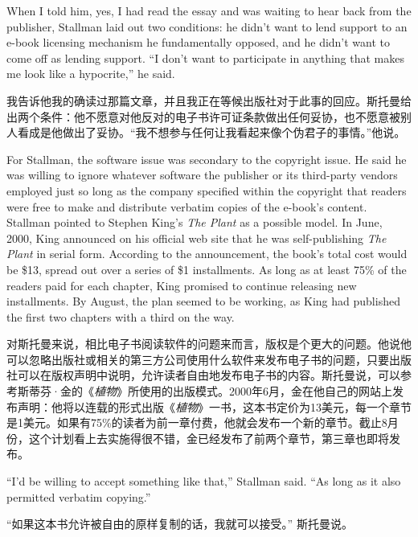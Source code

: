 \ifdefined\eng
When I told him, yes, I had read the essay and was waiting to hear back from the publisher, Stallman laid out two conditions: he didn't want to lend support to an e-book licensing mechanism he fundamentally opposed, and he didn't want to come off as lending support. ``I don't want to participate in anything that makes me look like a hypocrite,'' he said.
\fi

\ifdefined\chs
我告诉他我的确读过那篇文章，并且我正在等候出版社对于此事的回应。斯托曼给出两个条件：他不愿意对他反对的电子书许可证条款做出任何妥协，也不愿意被别人看成是他做出了妥协。``我不想参与任何让我看起来像个伪君子的事情。''他说。
\fi

\ifdefined\eng
For Stallman, the software issue was secondary to the copyright issue. He said he was willing to ignore whatever software the publisher or its third-party vendors employed just so long as the company specified within the copyright that readers were free to make and distribute verbatim copies of the e-book's content. Stallman pointed to Stephen King's \textit{The Plant} as a possible model. In June, 2000, King announced on his official web site that he was self-publishing \textit{The Plant} in serial form. According to the announcement, the book's total cost would be \$13, spread out over a series of \$1 installments. As long as at least 75\% of the readers paid for each chapter, King promised to continue releasing new installments. By August, the plan seemed to be working, as King had published the first two chapters with a third on the way.
\fi

\ifdefined\chs
对斯托曼来说，相比电子书阅读软件的问题来而言，版权是个更大的问题。他说他可以忽略出版社或相关的第三方公司使用什么软件来发布电子书的问题，只要出版社可以在版权声明中说明，允许读者自由地发布电子书的内容。斯托曼说，可以参考斯蒂芬·金的《\textit{植物}》所使用的出版模式。2000年6月，金在他自己的网站上发布声明：他将以连载的形式出版《\textit{植物}》一书，这本书定价为13美元，每一个章节是1美元。如果有75\%的读者为前一章付费，他就会发布一个新的章节。截止8月份，这个计划看上去实施得很不错，金已经发布了前两个章节，第三章也即将发布。
\fi

\ifdefined\eng
``I'd be willing to accept something like that,'' Stallman said. ``As long as it also permitted verbatim copying.'' %
\fi

\ifdefined\chs
``如果这本书允许被自由的原样复制的话，我就可以接受。'' 斯托曼说。%
\fi

